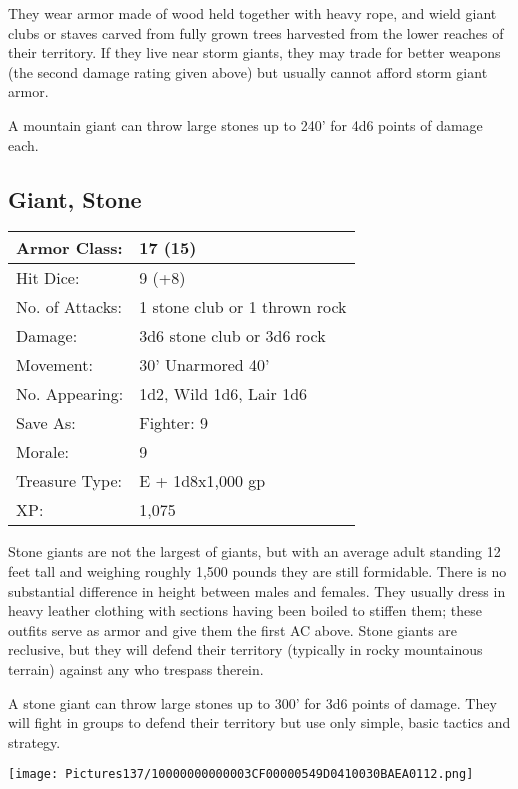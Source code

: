 \documentclass[a4paper,twoside,openany,10pt]{book}
\begin{document}
\begin{multicols}{2}
They wear armor made of wood held together with heavy rope, and wield giant clubs or staves carved from fully grown trees harvested from the lower reaches of their territory. If they live near storm giants, they may trade for better weapons (the second damage rating given above) but usually cannot afford storm giant armor.

A mountain giant can throw large stones up to 240' for 4d6 points of damage each.

\columnbreak

\subsection*{Giant, Stone}\label{giant-stone}

\begin{tabularx}{0.48\textwidth}{@{}lX@{}}
Armor Class: & 17 (15) \\\hline
Hit Dice: & 9 (+8) \\\hline
No. of Attacks: & 1 stone club or 1 thrown rock \\\hline
Damage: & 3d6 stone club or 3d6 rock \\\hline
Movement: & 30' Unarmored 40' \\\hline
No. Appearing: & 1d2, Wild 1d6, Lair 1d6 \\\hline
Save As: & Fighter: 9 \\\hline
Morale: & 9 \\\hline
Treasure Type: & E + 1d8x1,000 gp \\\hline
XP: & 1,075 \\\hline
\end{tabularx}\medskip

Stone giants are not the largest of giants, but with an average adult standing 12 feet tall and weighing roughly 1,500 pounds they are still formidable. There is no substantial difference in height between males and females. They usually dress in heavy leather clothing with sections having been boiled to stiffen them; these outfits serve as armor and give them the first AC above. Stone giants are reclusive, but they will defend their territory (typically in rocky mountainous terrain) against any who trespass therein.

A stone giant can throw large stones up to 300' for 3d6 points of damage. They will fight in groups to defend their territory but use only simple, basic tactics and strategy. 

\begin{center}
	\texttt{[image: Pictures137/10000000000003CF00000549D0410030BAEA0112.png]}
\end{center}


\end{multicols}
\end{document}

